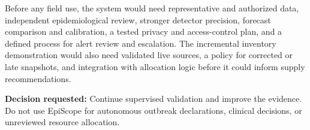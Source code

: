 Before any field use, the system would need representative and authorized data, independent epidemiological review, stronger detector precision, forecast comparison and calibration, a tested privacy and access-control plan, and a defined process for alert review and escalation. The incremental inventory demonstration would also need validated live sources, a policy for corrected or late snapshots, and integration with allocation logic before it could inform supply recommendations.

\vfill
\noindent\textbf{Decision requested:} Continue supervised validation and improve the evidence. Do not use EpiScope for autonomous outbreak declarations, clinical decisions, or unreviewed resource allocation.
